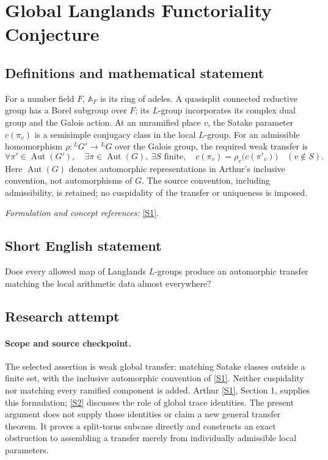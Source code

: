 \documentclass[11pt]{article}
\begin{document}
\section*{\texorpdfstring{Global Langlands Functoriality Conjecture}{Global Langlands Functoriality Conjecture}}\label{30006675}
\subsection{Definitions and mathematical statement}
For a number field $F$, ${\mathbb{A}}_F$ is its ring of adeles. A quasisplit connected reductive group has a Borel subgroup over $F$; its $L$-group incorporates its complex dual group and the Galois action. At an unramified place $v$, the Satake parameter $c(\pi_v)$ is a semisimple conjugacy class in the local $L$-group. For an admissible homomorphism $\rho:{}^LG'\to{}^LG$ over the Galois group, the required weak transfer is
\[
 \forall\pi'\in\operatorname{Aut}(G'),\quad \exists\pi\in\operatorname{Aut}(G),\ \exists S\text{ finite},\quad
 c(\pi_v)=\rho_v\bigl(c(\pi'_v)\bigr)\quad(v\notin S).
\]
Here $\operatorname{Aut}(G)$ denotes automorphic representations in Arthur's inclusive convention, not automorphisms of $G$. The source convention, including admissibility, is retained; no cuspidality of the transfer or uniqueness is imposed.
\par\smallskip\textit{Formulation and concept references:} \href{https://www.claymath.org/library/cw/arthur/pdf/76.pdf}{[S1]}.

\subsection{Short English statement}
Does every allowed map of Langlands $L$-groups produce an automorphic transfer matching the local arithmetic data almost everywhere?
\subsection{Research attempt}

\paragraph{Scope and source checkpoint.}
The selected assertion is weak global transfer: matching Satake classes
outside a finite set, with the inclusive automorphic convention of \href{https://www.claymath.org/library/cw/arthur/pdf/76.pdf}{[S1]}.
Neither cuspidality nor matching every ramified component is added. Arthur
\href{https://www.claymath.org/library/cw/arthur/pdf/76.pdf}{[S1]}, Section 1, supplies this formulation; \href{https://www.math.toronto.edu/arthur/pdf/arthur-func-and-trace-formula.pdf}{[S2]} discusses the role of
global trace identities. The present argument does not supply those
identities or claim a new general transfer theorem. It proves a split-torus
subcase directly and constructs an exact obstruction to assembling a
transfer merely from individually admissible local parameters.
\end{document}
